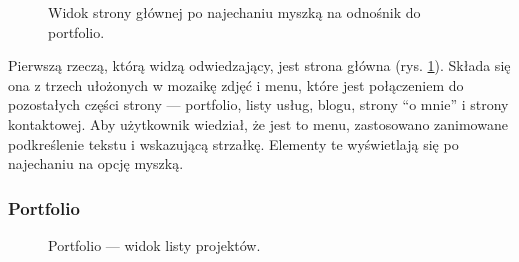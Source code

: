 \documentclass[a4paper, 12pt, twoside]{article}
\numberwithin{figure}{section}
\begin{document}
\begin{sloppypar}
\begin{figure}[H] 
    \vspace{0.5cm}
    \centering
   \caption{Widok strony głównej po najechaniu myszką na odnośnik do portfolio.}
   \label{fig:gotowa-aplikacja-1.jpg}
\end{figure}

Pierwszą rzeczą, którą widzą odwiedzający, jest strona główna (rys. \ref{fig:gotowa-aplikacja-1.jpg}). Składa się ona z trzech ułożonych w mozaikę zdjęć i menu, które jest połączeniem do pozostałych części strony --- portfolio, listy usług, blogu, strony ``o mnie'' i strony kontaktowej. Aby użytkownik wiedział, że jest to menu, zastosowano zanimowane podkreślenie tekstu i wskazującą strzałkę. Elementy te wyświetlają się po najechaniu na opcję myszką. 

\subsubsection*{Portfolio}

\begin{figure}[H] 
    \vspace{0.5cm}
    \centering
   \caption{Portfolio --- widok listy projektów.}
   \label{fig:gotowa-aplikacja-2.jpg}
\end{figure}


\end{sloppypar}
\end{document}
